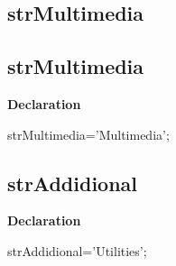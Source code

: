 \documentclass{report}
\newif\ifpdf
\begin{document}
\subsection*{\large{\textbf{strMultimedia}}\normalsize\hspace{1ex}\hrulefill}
\else
\subsection*{strMultimedia}
\fi
\label{trstrings-strMultimedia}
\begin{list}{}{
\setlength{\itemindent}{0cm}
\setlength{\listparindent}{0cm}
\setlength{\leftmargin}{\evensidemargin}
\addtolength{\leftmargin}{\tmplength}
\settowidth{\labelsep}{X}
\addtolength{\leftmargin}{\labelsep}
\setlength{\labelwidth}{\tmplength}
}
\item[\textbf{Declaration}\hfill]
\ifpdf
\begin{flushleft}
\fi
\begin{ttfamily}
strMultimedia='Multimedia';\end{ttfamily}

\ifpdf
\end{flushleft}
\fi

\end{list}
\ifpdf
\subsection*{\large{\textbf{strAddidional}}\normalsize\hspace{1ex}\hrulefill}
\else
\subsection*{strAddidional}
\fi
\label{trstrings-strAddidional}
\begin{list}{}{
\setlength{\itemindent}{0cm}
\setlength{\listparindent}{0cm}
\setlength{\leftmargin}{\evensidemargin}
\addtolength{\leftmargin}{\tmplength}
\settowidth{\labelsep}{X}
\addtolength{\leftmargin}{\labelsep}
\setlength{\labelwidth}{\tmplength}
}
\item[\textbf{Declaration}\hfill]
\ifpdf
\begin{flushleft}
\fi
\begin{ttfamily}
strAddidional='Utilities';\end{ttfamily}

\ifpdf
\end{flushleft}
\fi

\end{list}
\ifpdf
\end{document}
